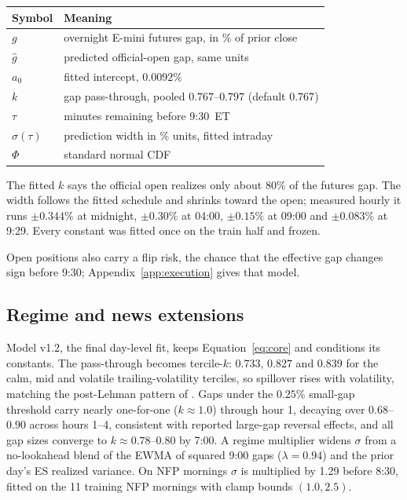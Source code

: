 \begin{center}
\small
\begin{tabular}{ll}
\toprule
Symbol & Meaning \\
\midrule
$g$ & overnight E-mini futures gap, in \% of prior close \\
$\hat g$ & predicted official-open gap, same units \\
$a_0$ & fitted intercept, $0.0092\%$ \\
$k$ & gap pass-through, pooled $0.767$--$0.797$ (default $0.767$) \\
$\tau$ & minutes remaining before 9:30~ET \\
$\sigma(\tau)$ & prediction width in \% units, fitted intraday \\
$\Phi$ & standard normal CDF \\
\bottomrule
\end{tabular}
\end{center}

The fitted $k$ says the official open realizes only about 80\% of the
futures gap. The width follows the fitted schedule and shrinks toward the
open; measured hourly it runs $\pm0.344\%$ at midnight, $\pm0.30\%$ at
04:00, $\pm0.15\%$ at 09:00 and $\pm0.083\%$ at 9:29. Every constant was
fitted once on the train half and frozen.

Open positions also carry a flip risk, the chance that the effective gap
changes sign before 9:30; Appendix~\ref{app:execution} gives that model.

\subsection{Regime and news extensions}
\label{sec:extensions}

Model v1.2, the final day-level fit, keeps Equation~\ref{eq:core} and
conditions its constants. The pass-through becomes tercile-$k$: 0.733,
0.827 and 0.839 for the calm, mid and volatile trailing-volatility
terciles, so spillover rises with volatility, matching the post-Lehman
pattern of \citet{ahoniemi2016overnight}. Gaps under the $0.25\%$
small-gap threshold carry nearly one-for-one ($k \approx 1.0$) through hour
1, decaying over $0.68$--$0.90$ across hours 1--4, consistent with
reported large-gap reversal effects, and all gap sizes converge to
$k \approx 0.78$--$0.80$ by 7:00. A regime multiplier widens $\sigma$ from
a no-lookahead blend of the EWMA of squared 9:00 gaps
($\lambda = 0.94$) and the prior day's ES realized variance. On NFP
mornings $\sigma$ is multiplied by 1.29 before 8:30, fitted on the 11
training NFP mornings with clamp bounds $(1.0, 2.5)$.

